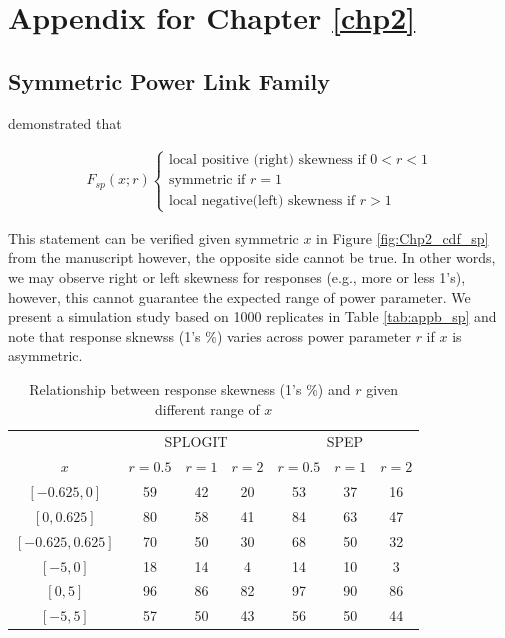 \chapter{Appendix for Chapter \ref{chp2}} \label{app:b}

\section{Symmetric Power Link Family}
 
\cite{Jiang2013} demonstrated that

\begin{align*}
 F_{sp}(x;r) \left \{\begin{array}{lll}
  \mbox{local positive (right) skewness if } 0<r<1 \\
  \mbox{symmetric if } r=1\\
  \mbox{local negative(left) skewness if } r>1
\end{array}\right. 
\end{align*}

This statement can be verified given symmetric $x$ in Figure \ref{fig:Chp2_cdf_sp} from the manuscript  however, the opposite side cannot be true. In other words, we may observe right or left skewness for responses (e.g., more or less 1's), however, this cannot guarantee the expected range of power parameter. We present a simulation study based on 1000 replicates in Table \ref{tab:appb_sp} and note that response sknewss (1's \%) varies across power parameter $r$ if $x$ is asymmetric. 

\begin{center}
\begin{table}[H]
\caption{Relationship between response skewness (1's \%) and $r$ given different range of $x$}
 \centering \small
  \begin{tabular}{ccccccc}
    \toprule
  & \multicolumn{3}{c}{SPLOGIT} & \multicolumn{3}{c}{SPEP}  \\
 \cmidrule(lr) {2-4}  \cmidrule(lr) {5-7}
 $x$ & $r=0.5$ & $r=1$ & $r=2$ & $r=0.5$ & $r=1$ & $r=2$\\
 \midrule 
 $[-0.625, 0]$ & 59 & 42 & 20 & 53 & 37 & 16 \\
 $[0, 0.625]$ & 80 & 58 & 41 & 84 & 63 & 47 \\
 $[-0.625, 0.625]$ & 70 & 50 & 30 & 68 & 50 & 32 \\
 $[-5, 0]$ & 18 & 14 & 4 & 14 & 10 & 3 \\
 $[0, 5]$ & 96 & 86 & 82 & 97 & 90 & 86\\
 $[-5, 5]$ & 57 & 50 & 43 & 56 & 50 & 44\\
    \bottomrule
  \end{tabular}
\end{table}
\label{tab:appb_sp}
\end{center}


